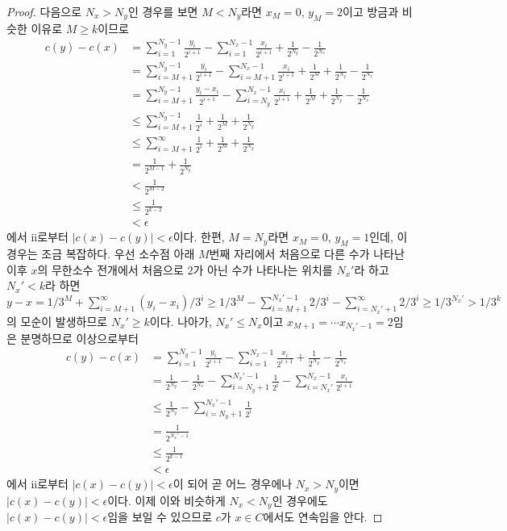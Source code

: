\begin{proof}
    다음으로 $N_x>N_y$인 경우를 보면 $M<N_y$라면 $x_M=0,\,y_M=2$이고 방금과 비슷한 이유로 $M\geq k$이므로
    \begin{align*}
        c(y)-c(x)&=\sum_{i=1}^{N_y-1}\frac{y_i}{2^{i+1}}-\sum_{i=1}^{N_x-1}\frac{x_i}{2^{i+1}}+\frac{1}{2^{N_y}}-\frac{1}{2^{N_x}}\\
        &=\sum_{i=M+1}^{N_y-1}\frac{y_i}{2^{i+1}}-\sum_{i=M+1}^{N_x-1}\frac{x_i}{2^{i+1}}+\frac{1}{2^M}+\frac{1}{2^{N_y}}-\frac{1}{2^{N_x}}\\
        &=\sum_{i=M+1}^{N_y-1}\frac{y_i-x_i}{2^{i+1}}-\sum_{i=N_y}^{N_x-1}\frac{x_i}{2^{i+1}}+\frac{1}{2^M}+\frac{1}{2^{N_y}}-\frac{1}{2^{N_x}}\\
        &\leq\sum_{i=M+1}^{N_y-1}\frac{1}{2^i}+\frac{1}{2^M}+\frac{1}{2^{N_y}}\\
        &\leq\sum_{i=M+1}^\infty\frac{1}{2^i}+\frac{1}{2^M}+\frac{1}{2^{N_y}}\\
        &=\frac{1}{2^{M-1}}+\frac{1}{2^{N_y}}\\
        &<\frac{1}{2^{M-2}}\\
        &\leq\frac{1}{2^{k-2}}\\
        &<\epsilon
    \end{align*}
    에서 ii로부터 $|c(x)-c(y)|<\epsilon$이다. 한편, $M=N_y$라면 $x_M=0,\,y_M=1$인데, 이 경우는 조금 복잡하다. 우선 소수점 아래 $M$번째 자리에서 처음으로 다른 수가 나타난 이후 $x$의 무한소수 전개에서 처음으로 $2$가 아닌 수가 나타나는 위치를 $N_x'$라 하고 $N_x'<k$라 하면 $y-x=1/3^M+\sum_{i=M+1}^\infty(y_i-x_i)/3^i\geq1/3^M-\sum_{i=M+1}^{N_x'-1}2/3^i-\sum_{i=N_x'+1}^\infty2/3^i\geq1/3^{N_x'}>1/3^k$의 모순이 발생하므로 $N_x'\geq k$이다. 나아가, $N_x'\leq N_x$이고 $x_{M+1}=\cdots x_{N_x'-1}=2$임은 분명하므로 이상으로부터
    \begin{align*}
        c(y)-c(x)&=\sum_{i=1}^{N_y-1}\frac{y_i}{2^{i+1}}-\sum_{i=1}^{N_x-1}\frac{x_i}{2^{i+1}}+\frac{1}{2^{N_y}}-\frac{1}{2^{N_x}}\\
        &=\frac{1}{2^{N_y}}-\frac{1}{2^{N_x}}-\sum_{i=N_y+1}^{N_x'-1}\frac{1}{2^i}-\sum_{i=N_x'}^{N_x-1}\frac{x_i}{2^{i+1}}\\
        &\leq\frac{1}{2^{N_y}}-\sum_{i=N_y+1}^{N_x'-1}\frac{1}{2^i}\\
        &=\frac{1}{2^{N_x'-1}}\\
        &\leq\frac{1}{2^{k-1}}\\
        &<\epsilon
    \end{align*}
    에서 ii로부터 $|c(x)-c(y)|<\epsilon$이 되어 곧 어느 경우에나 $N_x>N_y$이면 $|c(x)-c(y)|<\epsilon$이다. 이제 이와 비슷하게 $N_x<N_y$인 경우에도 $|c(x)-c(y)|<\epsilon$임을 보일 수 있으므로 $c$가 $x\in C$에서도 연속임을 안다.


\end{proof}
